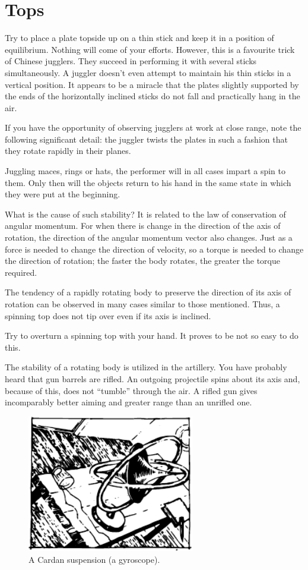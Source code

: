 \section{Tops}

Try to place a plate topside up on a thin stick and keep
it in a position of equilibrium. Nothing will come of your
efforts. However, this is a favourite trick of Chinese
jugglers. They succeed in performing it with several sticks
simultaneously. A juggler doesn't even attempt to maintain his thin sticks in a vertical position. It appears to
be a miracle that the plates slightly supported by the
ends of the horizontally inclined sticks do not fall and
practically hang in the air.

If you have the opportunity of observing jugglers at
work at close range, note the following significant detail:
the juggler twists the plates in such a fashion that they
rotate rapidly in their planes.

Juggling maces, rings or hats, the performer will in
all cases impart a spin to them. Only then will the objects
return to his hand in the same state in which they were
put at the beginning.

What is the cause of such stability? It is related to
the law of conservation of angular momentum. For when
there is change in the direction of the axis of rotation,
the direction of the angular momentum vector also changes.
Just as a force is needed to change the direction of
velocity, so a torque is needed to change the direction
of rotation; the faster the body rotates, the greater the
torque required.

The tendency of a rapidly rotating body to preserve
the direction of its axis of rotation can be observed in
many cases similar to those mentioned. Thus, a spinning
top does not tip over even if its axis is inclined.

Try to overturn a spinning top with your hand. It
proves to be not so easy to do this.

The stability of a rotating body is utilized in the artillery. You have probably heard that gun barrels are rifled.
An outgoing projectile spins about its axis and, because
of this, does not ``tumble'' through the air. A rifled gun
gives incomparably better aiming and greater range than
an unrifled one.
 \begin{figure}[!ht]
 \centering
 \includegraphics[width=0.65\textwidth]{figures/fig-5-15.pdf}
 \caption{A Cardan suspension (a gyroscope).}
 \label{fig-5-15}
 \end{figure}

